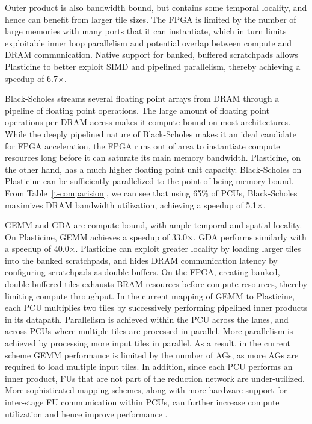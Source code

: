 Outer product is also bandwidth bound, but contains some temporal locality, and hence can benefit from larger tile sizes. The FPGA is limited by the number of large memories with
many ports that it can instantiate, which in turn limits exploitable inner loop parallelism and potential overlap between compute and DRAM communication.
Native support for banked, buffered scratchpads allows Plasticine to better exploit SIMD and pipelined parallelism, thereby achieving a speedup of 6.7$\times$.

Black-Scholes streams several floating point arrays from DRAM through a pipeline of floating point operations. The large amount of floating point
operations per DRAM access makes it compute-bound on most architectures. While the deeply pipelined nature of Black-Scholes makes it an ideal candidate for FPGA
acceleration, the FPGA runs out of area to instantiate compute resources long before it can saturate its main memory bandwidth. Plasticine, on the other hand,
has a much higher floating point unit capacity. Black-Scholes on Plasticine can be sufficiently parallelized to the point of being memory bound. From Table~\ref{t-comparision},
we can see that using 65\% of PCUs, Black-Scholes maximizes DRAM bandwidth utilization, achieving a
speedup of 5.1$\times$. 

GEMM and GDA are compute-bound, with ample temporal and spatial locality. On Plasticine, GEMM achieves a speedup of 33.0$\times$. GDA performs similarly
with a speedup of 40.0$\times$.
Plasticine can exploit greater locality by loading larger tiles into the banked scratchpads, and hides DRAM communication latency
by configuring scratchpads as double buffers. On the FPGA, creating banked, double-buffered tiles exhausts BRAM resources before compute resources, thereby
limiting compute throughput.
In the current mapping of GEMM to Plasticine, each PCU multiplies two tiles by successively performing pipelined inner products in its datapath. Parallelism is achieved within the PCU across the lanes,
and across PCUs where multiple tiles are processed in parallel. More parallelism is achieved by processing more input tiles in parallel. As a result, in the current scheme
GEMM performance is limited by the number of AGs, as more AGs are required to load multiple input tiles.
In addition, since each PCU performs an inner product, FUs that are not part of the reduction network are under-utilized.
More sophisticated mapping schemes, along with more hardware support for inter-stage FU communication within PCUs, can further increase compute utilization and hence improve performance \cite{LAC_SBAC}.

